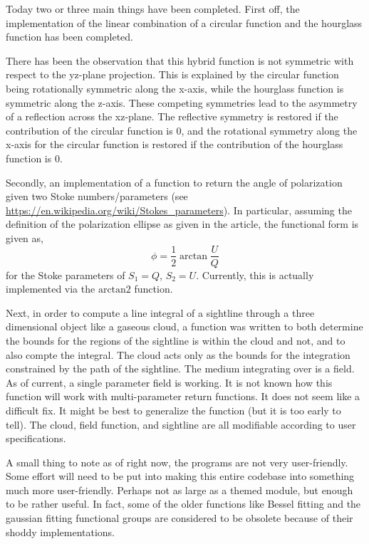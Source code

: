 \documentclass[twocolumn]{article}
\begin{document}
Today two or three main things have been completed. First off, the implementation of the linear combination of a circular function and the hourglass function has been completed.

There has been the observation that this hybrid function is not symmetric with respect to the yz-plane projection. This is explained by the circular function being rotationally symmetric along the x-axis, while the hourglass function is symmetric along the z-axis. These competing symmetries lead to the asymmetry of a reflection across the xz-plane. The reflective symmetry is restored if the contribution of the circular function is $0$, and the rotational symmetry along the x-axis for the circular function is restored if the contribution of the hourglass function is $0$.

Secondly, an implementation of a function to return the angle of polarization given two Stoke numbers/parameters (see \url{https://en.wikipedia.org/wiki/Stokes_parameters}). In particular, assuming the definition of the polarization ellipse as given in the article, the functional form is given as,
\begin{equation}
	\phi = \frac{1}{2} \arctan{\frac{U}{Q}}
\end{equation}
for the Stoke parameters of $S_1 = Q$, $S_2 = U$. Currently, this is actually implemented via the $\text{arctan2}$ function.

Next, in order to compute a line integral of a sightline through a three dimensional object like a gaseous cloud, a function was written to both determine the bounds for the regions of the sightline is within the cloud and not, and to also compte the integral. The cloud acts only as the bounds for the integration constrained by the path of the sightline. The medium integrating over is a field. As of current, a single parameter field is working. It is not known how this function will work with multi-parameter return functions. It does not seem like a difficult fix. It might be best to generalize the function (but it is too early to tell). The cloud, field function, and sightline are all modifiable according to user specifications. 

A small thing to note as of right now, the programs are not very user-friendly. Some effort will need to be put into making this entire codebase into something much more user-friendly. Perhaps not as large as a themed module, but enough to be rather useful. In fact, some of the older functions like Bessel fitting and the gaussian fitting functional groups are considered to be obsolete because of their shoddy implementations.




\printbibliography
\end{document}
